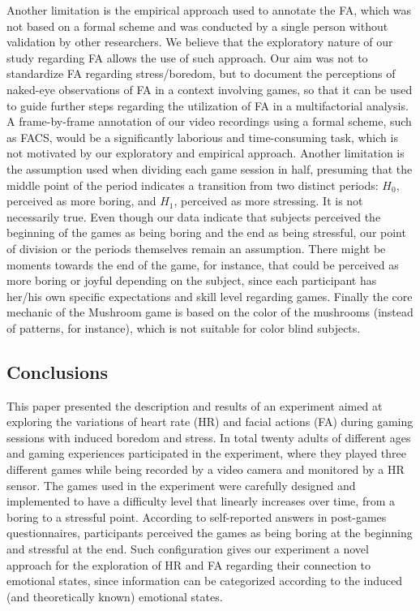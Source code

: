 Another limitation is the empirical approach used to annotate the FA, which was not based on a formal scheme and was conducted by a single person without validation by other researchers. We believe that the exploratory nature of our study regarding FA allows the use of such approach. Our aim was not to standardize FA regarding stress/boredom, but to document the perceptions of naked-eye observations of FA in a context involving games, so that it can be used to guide further steps regarding the utilization of FA in a multifactorial analysis. A frame-by-frame annotation of our video recordings using a formal scheme, such as FACS, would be a significantly laborious and time-consuming task, which is not motivated by our exploratory and empirical approach. Another limitation is the assumption used when dividing each game session in half, presuming that the middle point of the period indicates a transition from two distinct periods: $H_0$, perceived as more boring, and $H_1$, perceived as more stressing. It is not necessarily true. Even though our data indicate that subjects perceived the beginning of the games as being boring and the end as being stressful, our point of division or the periods themselves remain an assumption. There might be moments towards the end of the game, for instance, that could be perceived as more boring or joyful depending on the subject, since each participant has her/his own specific expectations and skill level regarding games. Finally the core mechanic of the Mushroom game is based on the color of the mushrooms (instead of patterns, for instance), which is not suitable for color blind subjects.

\subsection{Conclusions}
This paper presented the description and results of an experiment aimed at exploring the variations of heart rate (HR) and facial actions (FA) during gaming sessions with induced boredom and stress. In total twenty adults of different ages and gaming experiences participated in the experiment, where they played three different games while being recorded by a video camera and monitored by a HR sensor. The games used in the experiment were carefully designed and implemented to have a difficulty level that linearly increases over time, from a boring to a stressful point. According to self-reported answers in post-games questionnaires, participants perceived the games as being boring at the beginning and stressful at the end. Such configuration gives our experiment a novel approach for the exploration of HR and FA regarding their connection to emotional states, since information can be categorized according to the induced (and theoretically known) emotional states.

